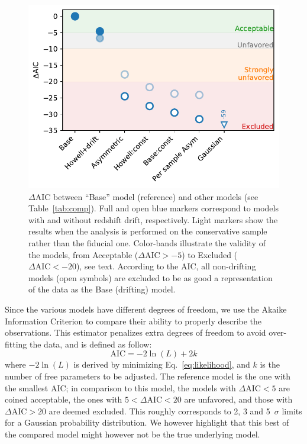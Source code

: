 \documentclass[]{aa} %
\newcommand{\mr}[1]{{\textcolor[rgb]{0.60,0.10,0.6}{#1}}}
\begin{document}
\begin{figure}
    \centering
    \includegraphics[width=\linewidth]{Article_figures/mod_comp.pdf}
    \caption{$\Delta$AIC between ``Base'' model (reference) and other models
        (see Table~\ref{tab:comp}). Full and open blue markers correspond to
        models with and without redshift drift, respectively. Light markers show
        the results when the analysis is performed on the conservative sample
        rather than the fiducial one.  Color-bands illustrate the validity of
        the models, from  Acceptable ($\Delta\mathrm{AIC} > -5$) to Excluded
        ($\Delta\mathrm{AIC} < -20$), see text. According to the AIC, all
        non-drifting models (open symbols) are excluded to be as good a
        representation of the data as the Base (drifting) model.}
    \label{fig:mod_comp}
\end{figure}

Since the various models have different degrees of freedom, we use the Akaike
Information Criterion \citep[AIC, e.g.][]{burnham2004} to compare their ability
to properly describe the observations. This estimator penalizes extra degrees of
freedom to avoid over-fitting the data, and is defined as follow:
\begin{equation}
    \mathrm{AIC} = -2\ln(L) + 2k
\end{equation}
where $-2\ln(L)$ is derived by minimizing Eq.~\eqref{eq:likelihood}, and $k$ is
the number of free parameters to be adjusted. The reference model is the one
with the smallest AIC; in comparison to this model, the models with
$\Delta\mathrm{AIC}<5$ are coined acceptable, the ones with
$5<\Delta\mathrm{AIC}<20$ are unfavored, and those with $\Delta\mathrm{AIC}>20$
are deemed excluded. This roughly corresponds to 2, 3 and 5~$\sigma$ limits for a Gaussian probability distribution. \mr{We however highlight that this best of the compared model might however not be the true underlying model.}
\end{document}
